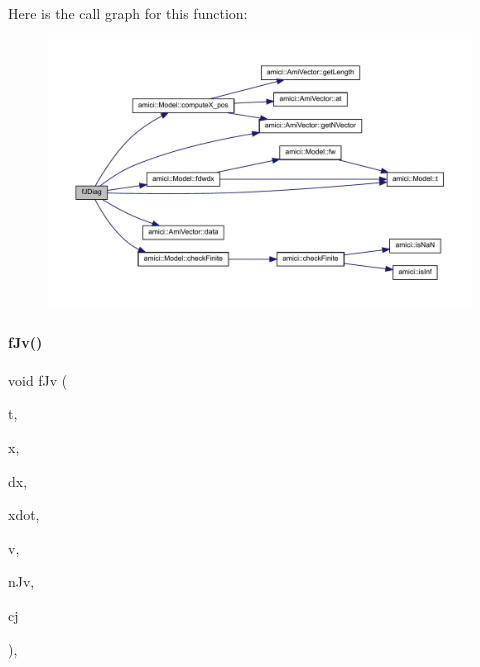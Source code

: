 Here is the call graph for this function\+:
\nopagebreak
\begin{figure}[H]
\begin{center}
\leavevmode
\includegraphics[width=350pt]{classamici_1_1_model___d_a_e_a58cf5aaa5fbcf6195407e7651f05c218_cgraph}
\end{center}
\end{figure}
\mbox{\label{classamici_1_1_model___d_a_e_a1a0549510cbe20e4d3c28bf77fc722ed}} 
\paragraph{\texorpdfstring{f\+Jv()}{fJv()}\hspace{0.1cm}{\footnotesize\ttfamily [1/3]}}
{\footnotesize\ttfamily void f\+Jv (\begin{DoxyParamCaption}\item[{\mbox{\hyperlink{namespaceamici_a1bdce28051d6a53868f7ccbf5f2c14a3}{realtype}}}]{t,  }\item[{\mbox{\hyperlink{classamici_1_1_ami_vector}{Ami\+Vector}} $\ast$}]{x,  }\item[{\mbox{\hyperlink{classamici_1_1_ami_vector}{Ami\+Vector}} $\ast$}]{dx,  }\item[{\mbox{\hyperlink{classamici_1_1_ami_vector}{Ami\+Vector}} $\ast$}]{xdot,  }\item[{\mbox{\hyperlink{classamici_1_1_ami_vector}{Ami\+Vector}} $\ast$}]{v,  }\item[{\mbox{\hyperlink{classamici_1_1_ami_vector}{Ami\+Vector}} $\ast$}]{n\+Jv,  }\item[{\mbox{\hyperlink{namespaceamici_a1bdce28051d6a53868f7ccbf5f2c14a3}{realtype}}}]{cj }\end{DoxyParamCaption})\hspace{0.3cm}{\ttfamily [override]}, {\ttfamily [virtual]}}

